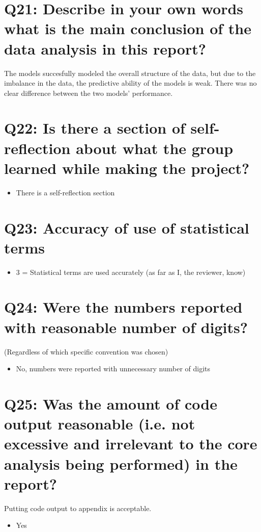 \documentclass[11pt,a4paper]{article}
\begin{document}
\section{Q21: Describe in your own words what is the main conclusion of the data analysis in this report?}
The models succesfully modeled the overall structure of the data, but due to the imbalance in the data, the predictive ability of the models is weak. There was no clear difference between the two models' performance.

\section{Q22: Is there a section of self-reflection about what the group learned while making the project?}
\begin{itemize}
    \item There is a self-reflection section
\end{itemize}

\section{Q23: Accuracy of use of statistical terms}
\begin{itemize}
    \item 3 = Statistical terms are used accurately (as far as I, the reviewer, know)
\end{itemize}

\section{Q24: Were the numbers reported with reasonable number of digits?}
(Regardless of which specific convention was chosen)
\begin{itemize}
    \item No, numbers were reported with unnecessary number of digits
\end{itemize}

\section{Q25: Was the amount of code output reasonable (i.e. not excessive and irrelevant to the core analysis being performed) in the report?}
Putting code output to appendix is acceptable.
\begin{itemize}
    \item Yes
\end{itemize}
\end{document}
